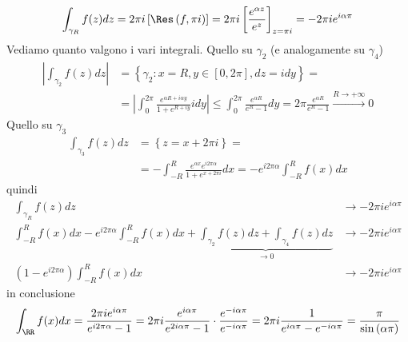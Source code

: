 \begin{figure}[htpb]
\end{figure}
\FloatBarrier

\begin{equation*}
\int_{\gamma_{R}} f(z) dz = 2\pi i\left[\Res \left(f, \pi i\right)\right] = 2\pi i\left[\frac{e^{\alpha z}}{e^{z}}\right]_{z = \pi i} = - 2\pi ie^{i\alpha \pi}
\end{equation*}
Vediamo quanto valgono i vari integrali. Quello su $\gamma_{2}$ (e analogamente su $\gamma_{4}$)
\begin{align*}
\left| \int_{\gamma_{2}} f(z) dz\right| & = \left\{\gamma_{2} :x = R, y\in \left[ 0, 2\pi \right], dz = idy\right\} = \\
 & = \left| \int^{2\pi}_{0}\frac{e^{\alpha R + i\alpha y}}{1 + e^{R + iy}} idy\right| \leq \int^{2\pi}_{0}\frac{e^{\alpha R}}{e^{R} - 1} dy = 2\pi \frac{e^{\alpha R}}{e^{R} - 1}\xrightarrow{R\rightarrow + \infty} 0
\end{align*}
Quello su $\gamma_{3}$
\begin{align*}
\int_{\gamma_{3}} f(z) dz & = \left\{z = x + 2\pi i\right\} = \\
 & = - \int^{R}_{- R}\frac{e^{\alpha x} e^{i2\pi \alpha}}{1 + e^{x + 2\pi i}} dx = -e^{i2\pi \alpha}\int^{R}_{- R} f(x) dx
\end{align*}
quindi
\begin{align*}
\int_{\gamma_{R}} f(z) dz & \rightarrow - 2\pi ie^{i\alpha \pi}\\
\int^{R}_{- R} f(x) dx - e^{i2\pi \alpha}\int^{R}_{- R} f(x) dx + \underbrace{\int_{\gamma_{2}} f(z) dz + \int_{\gamma_{4}} f(z) dz}_{\rightarrow 0} & \rightarrow - 2\pi ie^{i\alpha \pi}\\
\left(1 - e^{i2\pi \alpha}\right)\int^{R}_{- R} f(x) dx & \rightarrow - 2\pi ie^{i\alpha \pi}
\end{align*}
in conclusione
\begin{equation*}
\int_{\RR} f(x) dx = \frac{2\pi ie^{i\alpha \pi}}{e^{i2\pi \alpha} - 1} = 2\pi i\frac{e^{i\alpha \pi}}{e^{2i\alpha \pi} - 1} \cdot \frac{e^{- i\alpha \pi}}{e^{- i\alpha \pi}} = 2\pi i\frac{1}{e^{i\alpha \pi} - e^{- i\alpha \pi}} = \frac{\pi}{\sin\left(\alpha \pi \right)}
\end{equation*}
